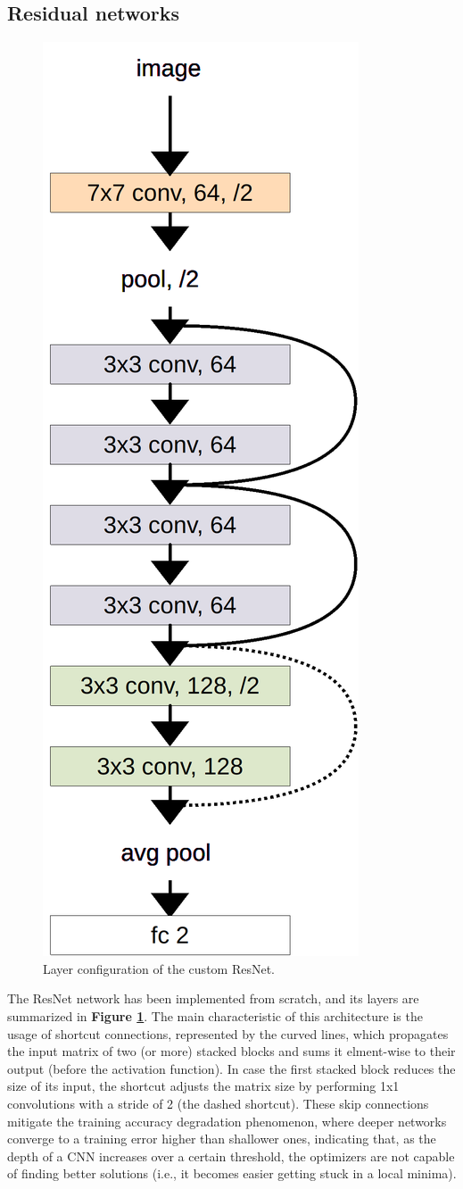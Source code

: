 
\subsection{Residual networks} %

\begin{figure}[ht!]
    \centering
    \includegraphics[height=0.8\linewidth, angle=90]{images/convLayers.png}
    \caption{Layer configuration of the custom ResNet.}
    \label{fig:resnet_layers}
\end{figure}
\noindent
The ResNet network has been implemented from scratch, and its layers are summarized in \textbf{Figure \ref{fig:resnet_layers}}. The main characteristic of this architecture is the usage of shortcut connections, represented by the curved lines, which propagates the input matrix of two (or more) stacked blocks and sums it elment-wise to their output (before the activation function). In case the first stacked block reduces the size of its input, the shortcut adjusts the matrix size by performing 1x1 convolutions with a stride of 2 (the dashed shortcut).
These skip connections mitigate the training accuracy degradation phenomenon, where deeper networks converge to a training error higher than shallower ones, indicating that, as the depth of a CNN increases over a certain threshold, the optimizers are not capable of finding better solutions (i.e., it becomes easier getting stuck in a local minima).\\

